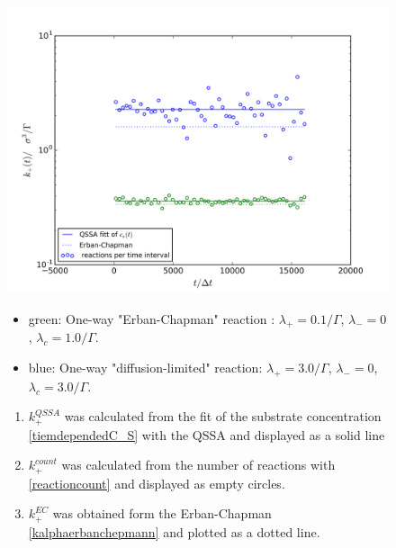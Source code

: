 \documentclass[
  a4paper,BCOR10mm,twoside,
  headsepline,footsepline,%
  fleqn,openbib
]{scrbook}
\begin{document}
\begin{figure}
  \centering
  \includegraphics[width=\textwidth]{./data/chapman-limit-concentrations1_k1.png}
  \captionsetup{width=\linewidth}
  \begin{small}
  \begin{itemize}
  \item green: One-way "Erban-Chapman" reaction :  $\lambda_+=0.1/\Gamma$, $\lambda_-=0$,  $\lambda_c=1.0/\Gamma$.
  \item blue: One-way "diffusion-limited" reaction: $\lambda_+=3.0/\Gamma$, $\lambda_-=0$,  $\lambda_c=3.0/\Gamma$.
  \end{itemize}
  \begin{enumerate}
  \item $k^{QSSA}_+$ was calculated from the fit of the substrate concentration \cref{tiemdependedC_S} with the QSSA and displayed as a solid line
  \item $k^{count}_+$ was calculated from the number of reactions with \cref{reactioncount} and displayed as empty circles.
  \item  $k^{EC}_+$ was obtained form the Erban-Chapman \cref{kalphaerbanchepmann} and plotted as a dotted line.
  \end{enumerate}
  \end{small}

\end{figure}
\end{document}
